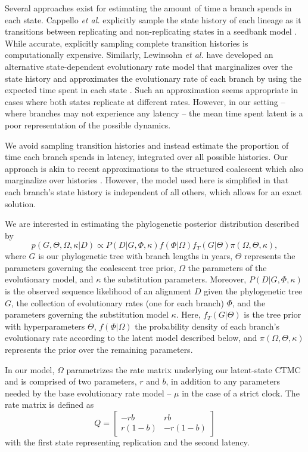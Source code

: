 \documentclass[11pt,a4paper]{article}
\begin{document}
Several approaches exist for estimating the amount of time a branch spends in each state.
Cappello \textit{et al.} explicitly sample the state history of each lineage as it transitions between replicating and non-replicating states in a seedbank model \cite{Cappello2025-dl}.
While accurate, explicitly sampling complete transition histories is computationally expensive.
Similarly, Lewinsohn \textit{et al.} have developed an alternative state-dependent evolutionary rate model that marginalizes over the state history and approximates the evolutionary rate of each branch by using the expected time spent in each state \cite{Lewinsohn2022-pf}.
Such an approximation seems appropriate in cases where both states replicate at different rates.
However, in our setting -- where branches may not experience any latency -- the mean time spent latent is a poor representation of the possible dynamics.

We avoid sampling transition histories and instead estimate the proportion of time each branch spends in latency, integrated over all possible histories.
Our approach is akin to recent approximations to the structured coalescent which also marginalize over histories \cite{Muller2018-bs,Muller2017-jk,De-Maio2015-eo,Shao2025}.
However, the model used here is simplified in that each branch's state history is independent of all others, which allows for an exact solution.

We are interested in estimating the phylogenetic posterior distribution described by
\begin{equation}
p(G,\Theta,\Omega,\kappa|D) \propto P(D|G,\Phi,\kappa)f(\Phi|\Omega)f_T(G|\Theta)\pi(\Omega,\Theta,\kappa),
\end{equation}
where $G$ is our phylogenetic tree with branch lengths in years, $\Theta$ represents the parameters governing the coalescent tree prior, $\Omega$ the parameters of the evolutionary model, and $\kappa$ the substitution parameters. 
Moreover, $P(D|G,\Phi,\kappa)$ is the observed sequence likelihood of an alignment $D$ given the phylogenetic tree $G$, the collection of evolutionary rates (one for each branch) $\Phi$, and the parameters governing the substitution model $\kappa$. 
Here, $f_T(G|\Theta)$ is the tree prior with hyperparameters $\Theta$, $f(\Phi|\Omega)$ the probability density of each branch's evolutionary rate according to the latent model described below, and $\pi(\Omega,\Theta,\kappa)$ represents the prior over the remaining parameters.

In our model, $\Omega$ parametrizes the rate matrix underlying our latent-state CTMC and is comprised of two parameters, $r$ and $b$, in addition to any parameters needed by the base evolutionary rate model -- $\mu$ in the case of a strict clock. 
The rate matrix is defined as 
\begin{equation}
Q = \begin{bmatrix}
     -rb   & rb \\
     r(1-b) & -r(1-b)
    \end{bmatrix}
\end{equation}
with the first state representing replication and the second latency. 
\end{document}

